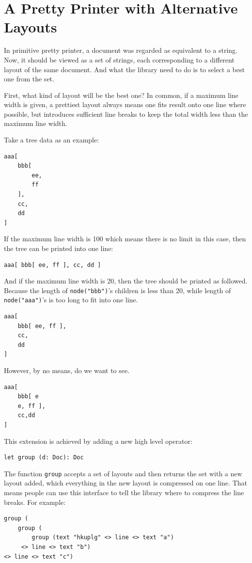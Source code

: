 \section{A Pretty Printer with Alternative Layouts} \label{section:printer}

In primitive pretty printer, a document was regarded as equivalent to a string. Now, it should be viewed as a set of strings, each corresponding to a different layout of the same document. And what the library need to do is to select a best one from the set.

First, what kind of layout will be the best one? In common, if a maximum line width is given, a prettiest layout always means one fits result onto one line where possible, but introduces sufficient line breaks to keep the total width less than the maximum line width\cite{wadler2003prettier}.

Take a tree data as an example:
\begin{lstlisting}
aaa[
    bbb[
        ee,
        ff
    ],
    cc,
    dd
]
\end{lstlisting}

If the maximum line width is 100 which means there is no limit in this case, then the tree can be printed into one line:
\begin{lstlisting}
aaa[ bbb[ ee, ff ], cc, dd ]
\end{lstlisting}

And if the maximum line width is 20, then the tree should be printed as followed. Because the length of \texttt{node("bbb")}'s children is less than 20, while length of \texttt{node("aaa")}'s is too long to fit into one line.
\begin{lstlisting}
aaa[
    bbb[ ee, ff ],
    cc,
    dd
]
\end{lstlisting}

However, by no means, do we want to see.
\begin{lstlisting}
aaa[
    bbb[ e
    e, ff ],
    cc,dd
]
\end{lstlisting}

This extension is achieved by adding a new high level operator:
\begin{lstlisting}
let group (d: Doc): Doc
\end{lstlisting}

The function \texttt{group} accepts a set of layouts and then returns the set with a new layout added, which everything in the new layout is compressed on one line. That means people can use this interface to tell the library where to compress the line breaks.
For example:
\begin{lstlisting}
group (
    group (
        group (text "hkuplg" <> line <> text "a")
     <> line <> text "b")
<> line <> text "c")
\end{lstlisting}

